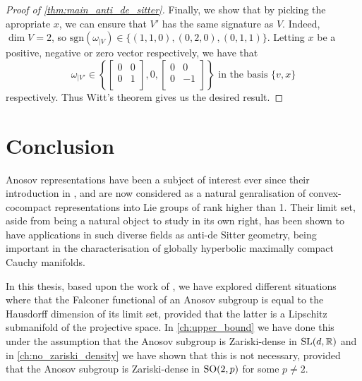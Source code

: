\documentclass{report}
\begin{document}
\begin{proof}[Proof of \cref{thm:main_anti_de_sitter}]
    Finally, we show that by picking the apropriate $x$, we can ensure that $V'$ has the same signature as $V$.
    Indeed, $\dim V = 2$, so $\mathrm{sgn}(\omega_{|V}) \in \{ (1,1,0), (0,2,0), (0,1,1) \}$.
    Letting $x$ be a positive, negative or zero vector respectively, we have that 
    \[
    \omega_{|V'} \in \left\{
        \begin{bmatrix}
        0 & 0 \\
        0 & 1 \\
        \end{bmatrix},
        0,
        \begin{bmatrix}
            0 & 0 \\
            0 & -1 \\
        \end{bmatrix}
    \right\} \text{ in the basis } \{v, x\}
    \]
    respectively.
    Thus Witt's theorem gives us the desired result.
\end{proof}

\chapter{Conclusion}
Anosov representations have been a subject of interest ever since their introduction in \cite{labourie_anosov_2006}, and are now considered as a natural genralisation of convex-cocompact representations into Lie groups of rank higher than 1.
Their limit set, aside from being a natural object to study in its own right, has been shown to have applications in such diverse fields as anti-de Sitter geometry, being important in the characterisation of globally hyperbolic maximally compact Cauchy manifolds.

In this thesis, based upon the work of \cite{pozzetti_anosov_2023}, we have explored different situations where that the Falconer functional of an Anosov subgroup is equal to the Hausdorff dimension of its limit set, provided that the latter is a Lipschitz submanifold of the projective space.
In \cref{ch:upper_bound} we have done this under the assumption that the Anosov subgroup is Zariski-dense in $\operatorname{{\mathrm{SL}}}(d, \mathbb R)$ and in \cref{ch:no_zariski_density} we have shown that this is not necessary, provided that the Anosov subgroup is Zariski-dense in $\operatorname{{\mathrm{SO}}}(2,p)$ for some $p \neq 2$.
\end{document}
